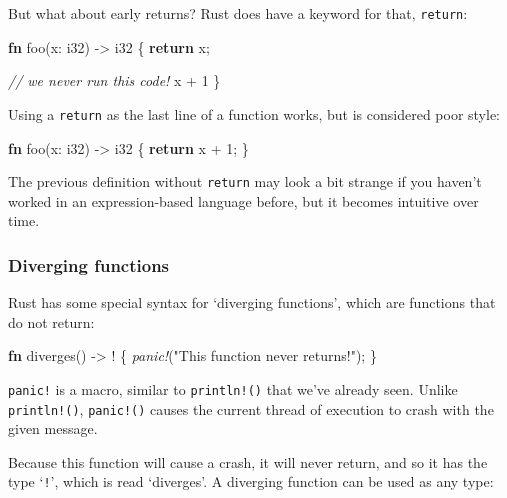 \documentclass[a4paper,]{book}
\newenvironment{Shaded}{\begin{snugshade}}{\end{snugshade}}
\newcommand{\KeywordTok}[1]{\textcolor[rgb]{0.13,0.29,0.53}{\textbf{{#1}}}}
\newcommand{\DataTypeTok}[1]{\textcolor[rgb]{0.13,0.29,0.53}{{#1}}}
\newcommand{\DecValTok}[1]{\textcolor[rgb]{0.00,0.00,0.81}{{#1}}}
\newcommand{\StringTok}[1]{\textcolor[rgb]{0.31,0.60,0.02}{{#1}}}
\newcommand{\CommentTok}[1]{\textcolor[rgb]{0.56,0.35,0.01}{\textit{{#1}}}}
\newcommand{\PreprocessorTok}[1]{\textcolor[rgb]{0.56,0.35,0.01}{\textit{{#1}}}}
\newcommand{\NormalTok}[1]{{#1}}
\begin{document}
But what about early returns? Rust does have a keyword for that,
\texttt{return}:

\begin{Shaded}
\begin{Highlighting}[]
\KeywordTok{fn} \NormalTok{foo(x: }\DataTypeTok{i32}\NormalTok{) -> }\DataTypeTok{i32} \NormalTok{\{}
    \KeywordTok{return} \NormalTok{x;}

    \CommentTok{// we never run this code!}
    \NormalTok{x + }\DecValTok{1}
\NormalTok{\}}
\end{Highlighting}
\end{Shaded}

Using a \texttt{return} as the last line of a function works, but is
considered poor style:

\begin{Shaded}
\begin{Highlighting}[]
\KeywordTok{fn} \NormalTok{foo(x: }\DataTypeTok{i32}\NormalTok{) -> }\DataTypeTok{i32} \NormalTok{\{}
    \KeywordTok{return} \NormalTok{x + }\DecValTok{1}\NormalTok{;}
\NormalTok{\}}
\end{Highlighting}
\end{Shaded}

The previous definition without \texttt{return} may look a bit strange
if you haven't worked in an expression-based language before, but it
becomes intuitive over time.

\subsubsection{Diverging functions}\label{diverging-functions}

Rust has some special syntax for `diverging functions', which are
functions that do not return:

\begin{Shaded}
\begin{Highlighting}[]
\KeywordTok{fn} \NormalTok{diverges() -> ! \{}
    \PreprocessorTok{panic!}\NormalTok{(}\StringTok{"This function never returns!"}\NormalTok{);}
\NormalTok{\}}
\end{Highlighting}
\end{Shaded}

\texttt{panic!} is a macro, similar to \texttt{println!()} that we've
already seen. Unlike \texttt{println!()}, \texttt{panic!()} causes the
current thread of execution to crash with the given message.

Because this function will cause a crash, it will never return, and so
it has the type `\texttt{!}', which is read `diverges'. A diverging
function can be used as any type:
\end{document}
